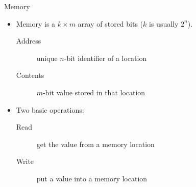 \documentclass[9pt,aspectratio=169,xcolor=table]{beamer}
\begin{document}
\begin{frame}{Memory}
    \begin{itemize}\itemsep6pt
        \item Memory is a $k \times m$ array of stored bits
              ($k$ is usually $2^n$).
            \begin{description}
                \item[Address] unique $n$-bit identifier of a location
                \item[Contents] $m$-bit value stored in that location
            \end{description}
        \item Two basic operations:
            \begin{description}
                \item[Read] get the value from a memory location
                \item[Write] put a value into a memory location
            \end{description}
    \end{itemize}
\end{frame}
\end{document}
